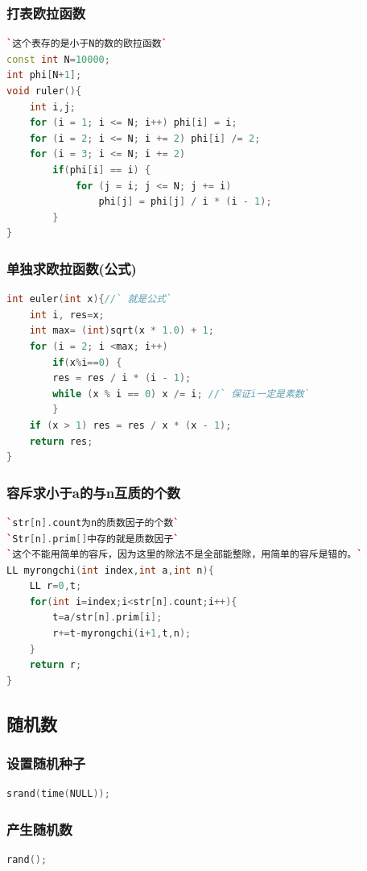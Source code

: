 \documentclass[a4paper]{article}
\begin{document}
\begin{CJK*}{UTF8}{gbsn}
\begin{multicols}{3}
\begin{flushleft}
\subsubsection{打表欧拉函数}
\begin{lstlisting}[language={c++}]
`这个表存的是小于N的数的欧拉函数`
const int N=10000; 
int phi[N+1]; 
void ruler(){ 
	int i,j; 
	for (i = 1; i <= N; i++) phi[i] = i;
	for (i = 2; i <= N; i += 2) phi[i] /= 2;
	for (i = 3; i <= N; i += 2) 
		if(phi[i] == i) {
			for (j = i; j <= N; j += i)
				phi[j] = phi[j] / i * (i - 1);
		}
} 
\end{lstlisting}


\subsubsection{单独求欧拉函数(公式)}
\begin{lstlisting}[language={c++}]
int euler(int x){//` 就是公式`
	int i, res=x;
	int max= (int)sqrt(x * 1.0) + 1; 
	for (i = 2; i <max; i++)
		if(x%i==0) {
		res = res / i * (i - 1);
		while (x % i == 0) x /= i; //` 保证i一定是素数`
		}
	if (x > 1) res = res / x * (x - 1);
	return res;
}
\end{lstlisting}


\subsubsection{容斥求小于a的与n互质的个数}
\begin{lstlisting}[language={c++}]
`str[n].count为n的质数因子的个数`
`Str[n].prim[]中存的就是质数因子`
`这个不能用简单的容斥，因为这里的除法不是全部能整除，用简单的容斥是错的。`
LL myrongchi(int index,int a,int n){
	LL r=0,t;
	for(int i=index;i<str[n].count;i++){
		t=a/str[n].prim[i];
		r+=t-myrongchi(i+1,t,n);
	}
	return r;	
}
\end{lstlisting}

\subsection{随机数}

\subsubsection{设置随机种子}
\begin{lstlisting}[language={c++}]
srand(time(NULL));
\end{lstlisting}

\subsubsection{产生随机数}
\begin{lstlisting}[language={c++}]
rand();
\end{lstlisting}





\end{flushleft}
\end{multicols}
\end{CJK*}
\end{document}
